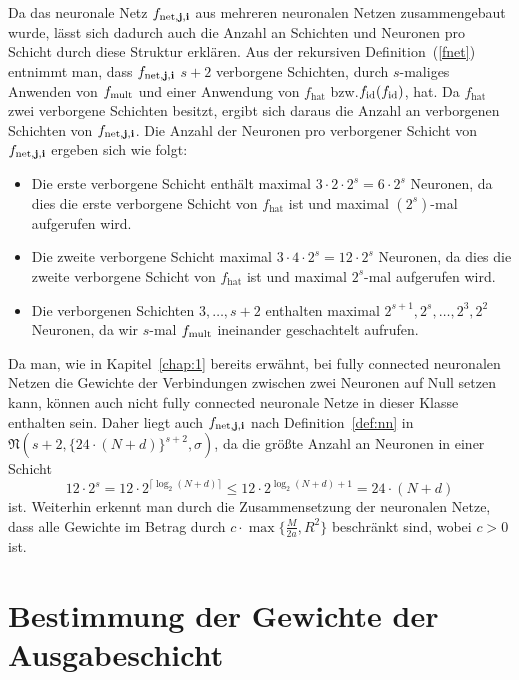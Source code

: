 Da das neuronale Netz $f_{\mathrm{net},\mathbf{j},\mathbf{i}}$ aus mehreren neuronalen Netzen zusammengebaut wurde, lässt sich dadurch auch die Anzahl an Schichten und Neuronen pro Schicht durch diese Struktur erklären. Aus der rekursiven Definition~(\ref{fnet}) entnimmt man, dass $f_{\mathrm{net},\mathbf{j},\mathbf{i}}$ $s + 2$ verborgene Schichten, durch $s$-maliges Anwenden von $f_{\mathrm{mult}}$ und einer Anwendung von $f_{\mathrm{hat}}$ bzw.\@ $f_{\mathrm{id}}(f_{\mathrm{id}})$, hat. Da $f_{\mathrm{hat}}$ zwei verborgene Schichten besitzt, ergibt sich daraus die Anzahl an verborgenen Schichten von $f_{\mathrm{net},\mathbf{j},\mathbf{i}}$.
Die Anzahl der Neuronen pro verborgener Schicht von $f_{\mathrm{net},\mathbf{j},\mathbf{i}}$ ergeben sich wie folgt:
\begin{itemize}
\item Die erste verborgene Schicht enthält maximal $3 \cdot 2 \cdot 2^s = 6 \cdot 2^s$ Neuronen, da dies die erste verborgene Schicht von $f_{\mathrm{hat}}$ ist und maximal $(2^s)$-mal aufgerufen wird. 
\item Die zweite verborgene Schicht maximal $3 \cdot 4 \cdot 2^s = 12\cdot 2^s$ Neuronen, da dies die zweite verborgene Schicht von $f_{\mathrm{hat}}$ ist und maximal $2^s$-mal aufgerufen wird.
\item Die verborgenen Schichten $3,\dots,s + 2$ enthalten maximal   $2^{s+ 1}, 2^s, \dots, 2^3, 2^2$ Neuronen, da wir $s$-mal $f_{\mathrm{mult}}$ ineinander geschachtelt aufrufen. 
\end{itemize}  
Da man, wie in Kapitel~\ref{chap:1} bereits erwähnt, bei fully connected neuronalen Netzen die Gewichte der Verbindungen zwischen zwei Neuronen auf Null setzen kann, können auch nicht fully connected neuronale Netze in dieser Klasse enthalten sein. Daher liegt auch $f_{\mathrm{net},\mathbf{j},\mathbf{i}}$ nach Definition~\ref{def:nn} in $\mathfrak{N}(s + 2,\{24 \cdot (N + d)\}^{s + 2},\sigma)$, da die größte Anzahl an Neuronen in einer Schicht $$12 \cdot 2^s = 12 \cdot 2^{\lceil\log_2(N + d)\rceil} \leq 12 \cdot 2^{\log_2(N + d) + 1} = 24 \cdot (N + d)$$ ist. Weiterhin erkennt man durch die Zusammensetzung der neuronalen Netze, dass alle Gewichte im Betrag durch $c \cdot \max\{\frac{M}{2a}, R^2\}$ beschränkt sind, wobei $c > 0$ ist. 

\section{Bestimmung der Gewichte der Ausgabeschicht}
\label{subsec:2.2}

